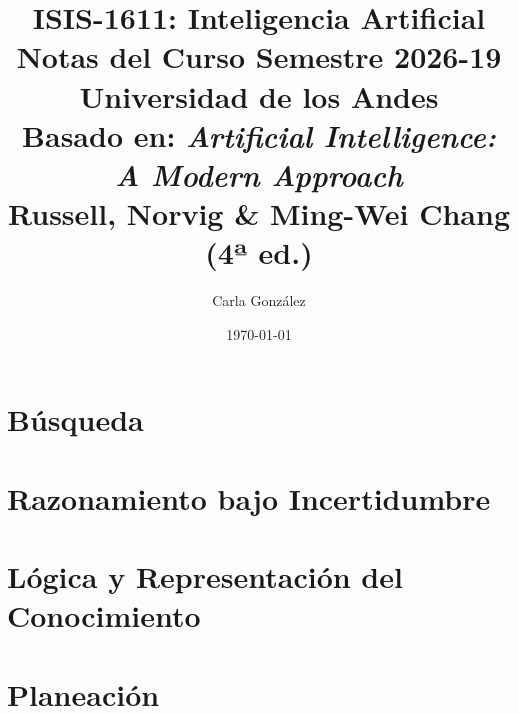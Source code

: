 \documentclass[11pt, a4paper]{report}
\title{%
    \textbf{ISIS-1611: Inteligencia Artificial}\\[0.5em]
    \large Notas del Curso Semestre 2026-19\\
    \normalsize Universidad de los Andes\\
    \normalsize Basado en: \textit{Artificial Intelligence: A Modern Approach}\\
    \normalsize Russell, Norvig \& Ming-Wei Chang (4ª ed.)
}
\author{Carla González}
\date{\today}
\begin{document}
\maketitle
\tableofcontents
\newpage

\part{Búsqueda}




\part{Razonamiento bajo Incertidumbre}





\part{Lógica y Representación del Conocimiento}



\part{Planeación}


\end{document}
